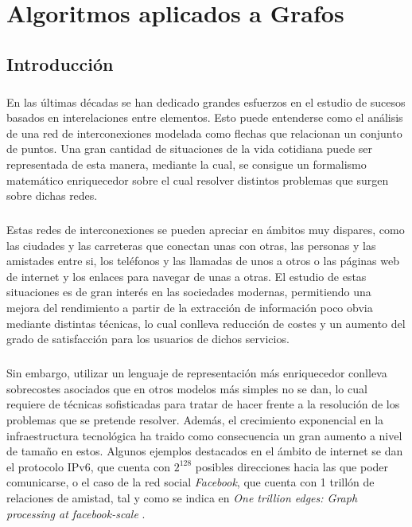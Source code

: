 \documentclass{subfiles}
\begin{document}
  \chapter{Algoritmos aplicados a Grafos}
  \label{chap:graphs}

    \section{Introducción}
    \label{sec:graphs_intro}

      \paragraph{}
      En las últimas décadas se han dedicado grandes esfuerzos en el estudio de sucesos basados en interelaciones entre elementos. Esto puede entenderse como el análisis de una red de interconexiones modelada como flechas que relacionan un conjunto de puntos. Una gran cantidad de situaciones de la vida cotidiana puede ser representada de esta manera, mediante la cual, se consigue un formalismo matemático enriquecedor sobre el cual resolver distintos problemas que surgen sobre dichas redes.

      \paragraph{}
      Estas redes de interconexiones se pueden apreciar en ámbitos muy dispares, como las ciudades y las carreteras que conectan unas con otras, las personas y las amistades entre si, los teléfonos y las llamadas de unos a otros o las páginas web de internet y los enlaces para navegar de unas a otras. El estudio de estas situaciones es de gran interés en las sociedades modernas, permitiendo una mejora del rendimiento a partir de la extracción de información poco obvia mediante distintas técnicas, lo cual conlleva reducción de costes y un aumento del grado de satisfacción para los usuarios de dichos servicios.

      \paragraph{}
      Sin embargo, utilizar un lenguaje de representación más enriquecedor conlleva sobrecostes asociados que en otros modelos más simples no se dan, lo cual requiere de técnicas sofisticadas para tratar de hacer frente a la resolución de los problemas que se pretende resolver. Además, el crecimiento exponencial en la infraestructura tecnológica ha traido como consecuencia un gran aumento a nivel de tamaño en estos. Algunos ejemplos destacados en el ámbito de internet se dan el protocolo IPv6, que cuenta con $2^128$ posibles direcciones hacia las que poder comunicarse, o el caso de la red social \emph{Facebook}, que cuenta con 1 trillón de relaciones de amistad, tal y como se indica en \emph{One trillion edges: Graph processing at facebook-scale} \cite{ching2015one}.
\end{document}
